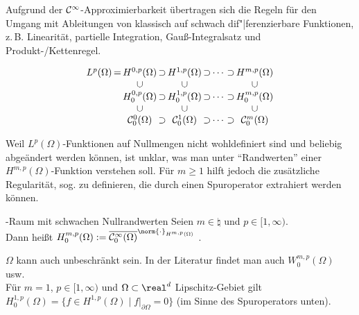 \begin{Bem}
    Aufgrund der $\mathcal{C}^\infty$-Approximierbarkeit übertragen sich die Regeln für den
    Umgang mit Ableitungen von klassisch auf schwach dif"|ferenzierbare Funktionen,
    z.\,B. Linearität, partielle Integration, Gauß-Integralsatz und Produkt-/Kettenregel.
\end{Bem}

\linie

\begin{floatingfigure}[r]{71mm}
    \vspace{-8mm}
    \footnotesize
    \begin{gather*}
        \arraycolsep=0.3mm
        \begin{array}{ccccccccc}
            L^p(\Omega)&=&H^{0,p}(\Omega)&\supset&H^{1,p}(\Omega)&
            \supset&\dotsb&\supset&H^{m,p}(\Omega)\\
            &&\cup&&\cup&&&&\cup\\
            &&H^{0,p}_0(\Omega)&\supset&H^{1,p}_0(\Omega)&
            \supset&\dotsb&\supset&H^{m,p}_0(\Omega)\\
            &&\cup&&\cup&&&&\cup\\
            &&\C^0_0(\Omega)&\supset&\C^1_0(\Omega)&
            \supset&\dotsb&\supset&\C^m_0(\Omega)
        \end{array}
    \end{gather*}
\end{floatingfigure}
\begin{Bem}
    Weil $L^p(\Omega)$-Funktionen auf Nullmengen nicht wohldefiniert sind und
    beliebig abgeändert werden können, ist unklar, was man unter "`Randwerten"' einer
    $H^{m,p}(\Omega)$-Funktion verstehen soll.
    Für $m \ge 1$ hilft jedoch die zusätzliche Regularität, sog. 
    zu definieren, die durch einen Spuroperator extrahiert werden können.
\end{Bem}

\begin{Def}{-Raum mit schwachen Nullrandwerten}
    Seien $m \in \natural$ und $p \in [1, \infty)$.\\
    Dann heißt $H^{m,p}_0(\Omega) :=
    \overline{\C^\infty_0(\Omega)}^{\norm{\cdot}_{H^{m,p}(\Omega)}}$
    .
\end{Def}

\begin{Bem}
    $\Omega$ kann auch unbeschränkt sein.
    In der Literatur findet man auch $W^{m,p}_0(\Omega)$ usw.\\
    Für $m = 1$, $p \in [1, \infty)$ und $\Omega \subset \real^d$ Lipschitz-Gebiet
    gilt $H^{1,p}_0(\Omega) = \{f \in H^{1,p}(\Omega) \;|\; f|_{\partial\Omega} = 0\}$
    (im Sinne des Spuroperators unten).
\end{Bem}

